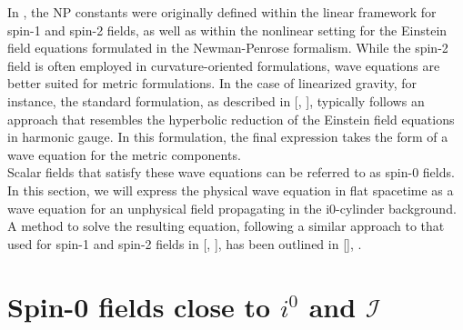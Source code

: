 In \cite{NewPen68}, the NP constants were originally defined within the linear framework for spin-1 and spin-2 fields, as well as within the nonlinear setting for the Einstein field equations formulated in the Newman-Penrose formalism.
While the spin-2 field is often employed in curvature-oriented formulations, wave equations are better suited for metric formulations. In the case of linearized gravity, for instance, the standard formulation, as described in [\cite{Mag07a}, \cite{Wal84a}], typically follows an approach that resembles the hyperbolic reduction of the Einstein field equations in harmonic gauge. In this formulation, the final expression takes the form of a wave equation for the metric components. \\

Scalar fields that satisfy these wave equations can be referred to as spin-0 fields. In this section, we will express the physical wave equation in flat spacetime as a wave equation for an unphysical field propagating in the i0-cylinder background. A method to solve the resulting equation, following a similar approach to that used for spin-1 and spin-2 fields in [\cite{Val07}, \cite{GasKro16d}], has been outlined in [\cite{MinMacKro22}], \cite{GasPin23}.
\section{Spin-0 fields close to $i^0$ and $\mathscr{I}$}
\label{sec:Spin0FieldsCloseToI0AndI}

